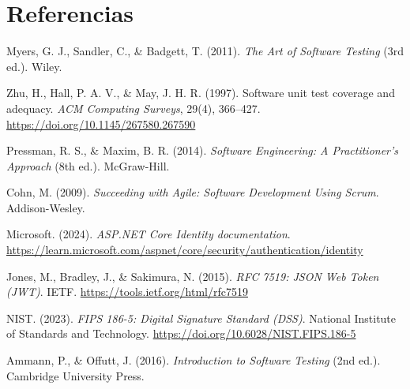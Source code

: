 \documentclass[11pt,a4paper]{article}
\begin{document}
\section*{Referencias}

\begin{enumerate}[label={[\arabic*]}, itemsep=4pt]
    \item Myers, G. J., Sandler, C., \& Badgett, T. (2011). \textit{The Art of Software Testing} (3rd ed.). Wiley.

    \item Zhu, H., Hall, P. A. V., \& May, J. H. R. (1997). Software unit test coverage and adequacy. \textit{ACM Computing Surveys}, 29(4), 366--427. \url{https://doi.org/10.1145/267580.267590}

    \item Pressman, R. S., \& Maxim, B. R. (2014). \textit{Software Engineering: A Practitioner's Approach} (8th ed.). McGraw-Hill.

    \item Cohn, M. (2009). \textit{Succeeding with Agile: Software Development Using Scrum}. Addison-Wesley.

    \item Microsoft. (2024). \textit{ASP.NET Core Identity documentation}. \url{https://learn.microsoft.com/aspnet/core/security/authentication/identity}

    \item Jones, M., Bradley, J., \& Sakimura, N. (2015). \textit{RFC 7519: JSON Web Token (JWT)}. IETF. \url{https://tools.ietf.org/html/rfc7519}

    \item NIST. (2023). \textit{FIPS 186-5: Digital Signature Standard (DSS)}. National Institute of Standards and Technology. \url{https://doi.org/10.6028/NIST.FIPS.186-5}

    \item Ammann, P., \& Offutt, J. (2016). \textit{Introduction to Software Testing} (2nd ed.). Cambridge University Press.
\end{enumerate}
\end{document}

